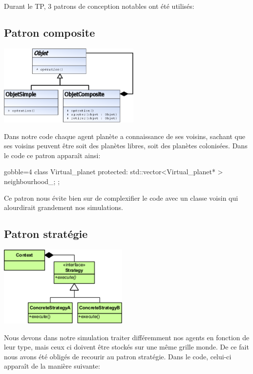   Durant le TP, 3 patrons de conception notables ont été utilisés:
  
  \subsection{Patron composite}
  \begin{center}
    \includegraphics[height=4cm]{images/composite.png}
  \end{center}

  Dans notre code chaque agent planète a connaissance de ses voisins, sachant que ses voisins peuvent être soit des planètes libres, soit des planètes colonisées. Dans le code ce patron apparaît ainsi:

  \begin{cppcode*}{gobble=4}
    class Virtual_planet
    {protected:
      std::vector<Virtual_planet* > neighbourhood_;
    };
  \end{cppcode*}
  Ce patron nous évite bien sur de complexifier le code avec un classe voisin qui alourdirait grandement nos simulations.

  \subsection{Patron stratégie}
  \begin{center}
    \includegraphics[height=4cm]{images/strategy.png}
  \end{center}

  Nous devons dans notre simulation traiter différemment nos agents en fonction de leur type, mais ceux ci doivent être stockés sur une même grille monde. De ce fait nous avons été obligés de recourir au patron stratégie. Dans le code, celui-ci apparaît de la manière suivante:

